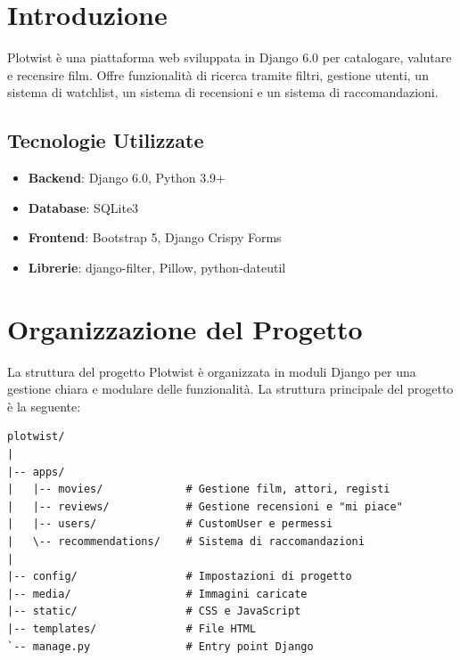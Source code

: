 \documentclass[12pt,a4paper]{report}
\begin{document}


\tableofcontents
\newpage

\chapter{Introduzione}

Plotwist è una piattaforma web sviluppata in Django 6.0 per catalogare, valutare e recensire film.
Offre funzionalità di ricerca tramite filtri, gestione utenti, un sistema di watchlist, un sistema di recensioni e un sistema di raccomandazioni.


\section{Tecnologie Utilizzate}
\begin{itemize}
    \item \textbf{Backend}: Django 6.0, Python 3.9+
    \item \textbf{Database}: SQLite3
    \item \textbf{Frontend}: Bootstrap 5, Django Crispy Forms
    \item \textbf{Librerie}: django-filter, Pillow, python-dateutil
\end{itemize}


\chapter{Organizzazione del Progetto}
La struttura del progetto Plotwist è organizzata in moduli Django per una gestione chiara e modulare delle funzionalità.
La struttura principale del progetto è la seguente:

\begin{lstlisting}[language={}, frame=none, numbers=none]
plotwist/
|
|-- apps/                   
|   |-- movies/             # Gestione film, attori, registi
|   |-- reviews/            # Gestione recensioni e "mi piace"
|   |-- users/              # CustomUser e permessi
|   \-- recommendations/    # Sistema di raccomandazioni
|
|-- config/                 # Impostazioni di progetto
|-- media/                  # Immagini caricate
|-- static/                 # CSS e JavaScript
|-- templates/              # File HTML
`-- manage.py               # Entry point Django
\end{lstlisting}

\vspace{20pt}
\end{document}

